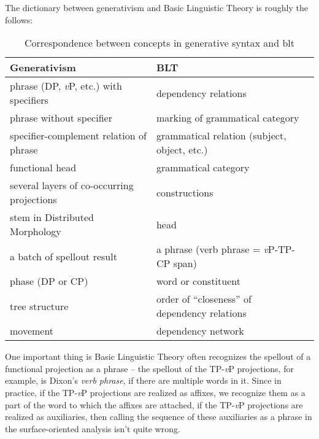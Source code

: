 \documentclass[UTF8, a4paper, oneside, scheme=plain]{ctexrep}
\newcommand*{\term}[1]{\emph{#1}}
\newcommand{\vP}{\textit{v}P}
\begin{document}
The dictionary between generativism and Basic Linguistic Theory is roughly the follows:
\begin{table}[H]
    \caption*{Correspondence between concepts in generative syntax and \acs{blt}}
    \centering
    \begin{tabular}{@{}lll@{}}
    \toprule
    Generativism                               & BLT                                          \\ \midrule
    phrase (DP, \vP, etc.) with specifiers     & dependency relations                          \\
    phrase without specifier                   & marking of grammatical category               \\
    specifier-complement relation of phrase    & grammatical relation (subject, object, etc.)  \\
    functional head                            & grammatical category                          \\
    several layers of co-occurring projections & constructions                                 \\
    stem in Distributed Morphology             & head                                          \\
    a batch of spellout result                 & a phrase (verb phrase = \vP-TP-CP span)       \\
    phase (DP or CP)                           & word or constituent                           \\
    tree structure                             & order of ``closeness'' of dependency relations  \\
    movement                                   & dependency network                            \\ \bottomrule
    \end{tabular}
\end{table}

One important thing is Basic Linguistic Theory often recognizes 
the spellout of a functional projection 
as a phrase -- 
the spellout of the TP-\vP{} projections, 
for example, is Dixon's \term{verb phrase}, 
if there are multiple words in it.
Since in practice, if the TP-\vP{} projections are realized as affixes, 
we recognize them as a part of the word to which the affixes are attached,
if the TP-\vP{} projections are realized as auxiliaries,
then calling the sequence of these auxiliaries as a phrase in the surface-oriented analysis 
isn't quite wrong.
\end{document}
